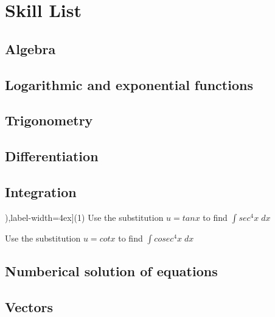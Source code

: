 \chapter{Skill List}

\section{Algebra}

\section{Logarithmic and exponential functions}

\section{Trigonometry}

\section{Differentiation}


\section{Integration}


\newpage
\begin{exercise}
    \begin{tasks}[after-item-skip=2pt,after-skip=3pt, counter-format=(tsk[1]),label-width=4ex](1)
        \task  Use the substitution $u=tanx$ to find $\displaystyle \int sec^4x \;   dx $ 
                
        \task  Use the substitution $u=cotx$ to find $\displaystyle \int cosec^4x \; dx $ 
                
    \end{tasks}
\end{exercise}


\section{Numberical solution of equations}


\section{Vectors}



